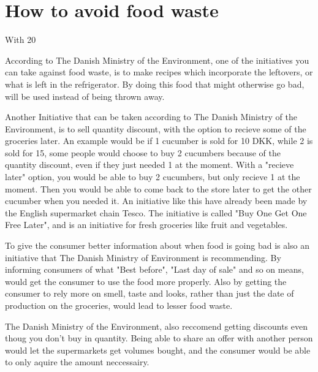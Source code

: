 \section{How to avoid food waste}

With 20 %

According to The Danish Ministry of the Environment, one of the initiatives you can take against food waste, is to make recipes which incorporate the leftovers, or what is left in the refrigerator. By doing this food that might otherwise go bad, will be used instead of being thrown away. %

Another Initiative that can be taken according to The Danish Ministry of the Environment, is to sell quantity discount, with the option to recieve some of the groceries later. An example would be if 1 cucumber is sold for 10 DKK, while 2 is sold for 15, some people would choose to buy 2 cucumbers because of the quantity discount, even if they just needed 1 at the moment. With a "recieve later" option, you would be able to buy 2 cucumbers, but only recieve 1 at the moment. Then you would be able to come back to the store later to get the other cucumber when you needed it. An initiative like this have already been made by the English supermarket chain Tesco. The initiative is called "Buy One Get One Free Later", and is an initiative for fresh groceries like fruit and vegetables.

To give the consumer better information about when food is going bad is also an initiative that The Danish Ministry of Environment is recommending. By informing consumers of what "Best before", "Last day of sale" and so on means, would get the consumer to use the food more properly. Also by getting the consumer to rely more on smell, taste and looks, rather than just the date of production on the groceries, would lead to lesser food waste.

The Danish Ministry of the Environment, also reccomend getting discounts even thoug you don't buy in quantity. Being able to share an offer with another person would let the supermarkets get volumes bought, and the consumer would be able to only aquire the amount neccessairy.

